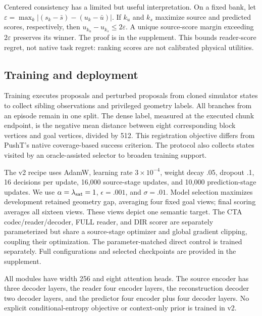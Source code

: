 Centered consistency has a limited but useful interpretation. On a fixed bank, let $\varepsilon=\max_k|(s_k-\bar s)-(u_k-\bar u)|$. If $k_u$ and $k_s$ maximize source and predicted scores, respectively, then $u_{k_u}-u_{k_s}\le2\varepsilon$. A unique source-score margin exceeding $2\varepsilon$ preserves its winner. The proof is in the supplement. This bounds reader-score regret, not native task regret: ranking scores are not calibrated physical utilities.

\subsection{Training and deployment}
\label{sec:training}
Training executes proposals and perturbed proposals from cloned simulator states to collect sibling observations and privileged geometry labels. All branches from an episode remain in one split. The dense label, measured at the executed chunk endpoint, is the negative mean distance between eight corresponding block vertices and goal vertices, divided by 512. This registration objective differs from PushT's native coverage-based success criterion. The protocol also collects states visited by an oracle-assisted selector to broaden training support.

The v2 recipe uses AdamW, learning rate $3\times10^{-4}$, weight decay .05, dropout .1, 16 decisions per update, 16,000 source-stage updates, and 10,000 prediction-stage updates. We use $\alpha=\lambda_{\rm sat}=1$, $\epsilon=.001$, and $\sigma=.01$. Model selection maximizes development retained geometry gap, averaging four fixed goal views; final scoring averages all sixteen views. These views depict one semantic target. The CTA codec/reader/decoder, FULL reader, and DIR scorer are separately parameterized but share a source-stage optimizer and global gradient clipping, coupling their optimization. The parameter-matched direct control is trained separately. Full configurations and selected checkpoints are provided in the supplement.

All modules have width 256 and eight attention heads. The source encoder has three decoder layers, the reader four encoder layers, the reconstruction decoder two decoder layers, and the predictor four encoder plus four decoder layers. No explicit conditional-entropy objective or context-only prior is trained in v2.

